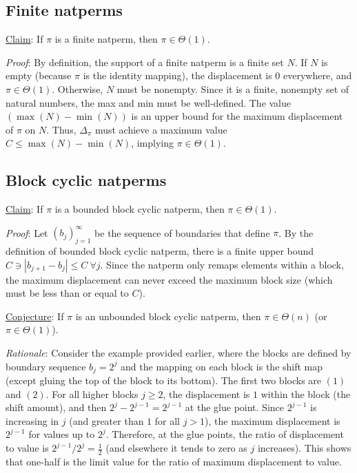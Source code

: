\documentclass[12pt,reqno]{article}
\begin{document}
\subsection{Finite natperms}

\underline{Claim}: If $\pi$ is a finite natperm, then $\pi \in \Theta(1)$.

\textit{Proof}: By definition, the support of a finite natperm is a finite set $N$. If $N$ is empty (because $\pi$ is the identity mapping), the displacement is $0$ everywhere, and $\pi \in \Theta(1)$. Otherwise, $N$ must be nonempty. Since it is a finite, nonempty set of natural numbers, the max and min must be well-defined. The value $(\max(N) - \min(N))$ is an upper bound for the maximum displacement of $\pi$ on $N$. Thus, $\Delta_\pi$ must achieve a maximum value $C \leq \max(N) - \min(N)$, implying $\pi \in \Theta(1)$.

\subsection{Block cyclic natperms}

\underline{Claim}: If $\pi$ is a bounded block cyclic natperm, then $\pi \in \Theta(1)$.

\textit{Proof}: Let $(b_j)_{j=1}^{\infty}$ be the sequence of boundaries that define $\pi$. By the definition of bounded block cyclic natperm, there is a finite upper bound $C \ni | b_{j+1} - b_j | \leq C \  \forall j$. Since the natperm only remaps elements within a block, the maximum displacement can never exceed the maximum block size (which must be less than or equal to $C$).

\underline{Conjecture}: If $\pi$ is an unbounded block cyclic natperm, then $\pi \in \Theta(n)$ (or $\pi \in \Theta(1)$).

\textit{Rationale}: Consider the example provided earlier, where the blocks are defined by boundary sequence $b_j = 2^j$ and the mapping on each block is the shift map (except gluing the top of the block to its bottom). The first two blocks are $(1)$ and $(2)$. For all higher blocks $j \geq 2$, the displacement is $1$ within the block (the shift amount), and then $2^j - 2^{j-1} = 2^{j-1}$ at the glue point. Since $2^{j-1}$ is increasing in $j$ (and greater than $1$ for all $j > 1$), the maximum displacement is $2^{j-1}$ for values up to $2^j$. Therefore, at the glue points, the ratio of displacement to value is $2^{j-1} / 2^j = \frac{1}{2}$ (and elsewhere it tends to zero as $j$ increases). This shows that one-half is the limit value for the ratio of maximum displacement to value.
\end{document}
